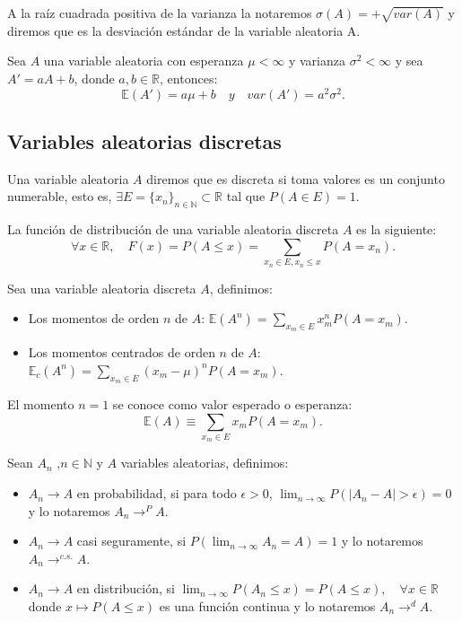 \documentclass[../proyecto.tex]{memoir}
\begin{document}
\begin{defi}
A la raíz cuadrada positiva de la varianza la notaremos $\sigma(A)=+\sqrt{var(A)}$ y diremos que es la desviación estándar de la variable aleatoria A. 
\end{defi}

\begin{prop}
Sea $A$ una variable aleatoria con esperanza $\mu < \infty$ y varianza $\sigma^2 < \infty$ y sea $A'=aA+b$, donde $a,b\in\mathds{R}$, entonces: $$
\mathds{E}(A')=a\mu + b \quad y \quad var(A') = a^2 \sigma^2.
$$

\end{prop}


\subsection{Variables aleatorias discretas}

\begin{defi}
Una variable aleatoria $A$ diremos que es discreta si toma valores es un conjunto numerable, esto es, $\exists E=\{x_n\}_{n \in \mathds{N}} \subset \mathds{R}$ tal que $P(A \in E)=1$. 
\end{defi}

\begin{defi}
La función de distribución de una variable aleatoria discreta $A$ es la siguiente: $$
\forall x\in \mathds{R}, \quad F(x) = P( A \leq x) = \sum_{x_n\in E, x_n \leq x} P(A=x_n).
$$
\end{defi}

\begin{defi}
Sea una variable aleatoria discreta $A$, definimos:

\begin{itemize}
\item Los momentos de orden $n$ de $A$: $\mathds{E}(A^n) = \sum_{x_m \in E} x_m^n P(A=x_m)$.
\item Los momentos centrados de orden $n$ de $A$: $\mathds{E}_c(A^n) =\sum_{x_m \in E} (x_m - \mu)^n P(A=x_m)$.
\end{itemize}
\end{defi}

El momento $n=1$ se conoce como valor esperado o esperanza: $$
\mathds{E}(A) \equiv \sum_{x_m \in E} x_m P(A=x_m).
$$

\begin{defi}
Sean ${A_n}$ ,$n\in \mathds{N}$ y $A$ variables aleatorias, definimos:
\begin{itemize}
\item $A_n \to A$ en probabilidad, si para todo $\epsilon > 0$, $\lim_{n\to\infty} P( |A_n-A|> \epsilon ) = 0$ y lo notaremos $A_n \to^{P} A$.
\item $A_n \to A$ casi seguramente, si $P(\lim_{n\to\infty} A_n=A) = 1$ y lo notaremos $A_n \to^{c.s.} A$.
\item $A_n \to A$ en distribución, si $\lim_{n \to \infty} P(A_n \leq x) = P(A \leq x),\quad \forall x \in \mathds{R}$ donde $x\mapsto P(A \leq x)$ es una función continua y lo notaremos $A_n \to^{d} A$.
\end{itemize}
\end{defi}
\end{document}
